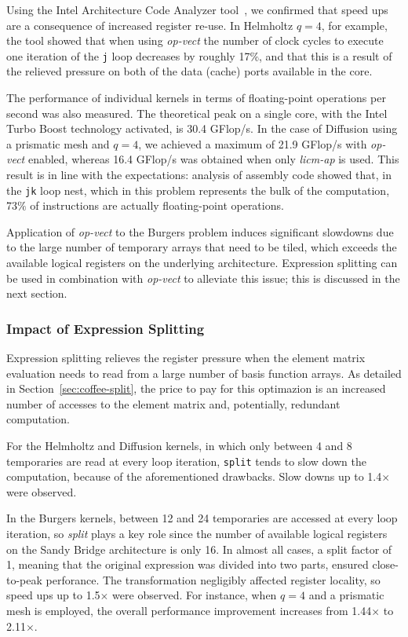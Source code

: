 Using the Intel Architecture Code Analyzer tool~\cite{IACA}, we confirmed that speed ups are a consequence of increased register re-use. In Helmholtz $q=4$, for example, the tool showed that when using \emph{op-vect} the number of clock cycles to execute one iteration of the \texttt{j} loop decreases by roughly 17$\%$, and that this is a result of the relieved pressure on both of the data (cache) ports available in the core.

The performance of individual kernels in terms of floating-point operations per second was also measured. The theoretical peak on a single core, with the Intel Turbo Boost technology activated, is 30.4 GFlop/s. In the case of Diffusion using a prismatic mesh and $q=4$, we achieved a maximum of 21.9 GFlop/s with \emph{op-vect} enabled, whereas 16.4 GFlop/s was obtained when only \emph{licm-ap} is used. This result is in line with the expectations: analysis of assembly code showed that, in the \texttt{jk} loop nest, which in this problem represents the bulk of the computation, 73$\%$ of instructions are actually floating-point operations.

Application of \emph{op-vect} to the Burgers problem induces significant slowdowns due to the large number of temporary arrays that need to be tiled, which exceeds the available logical registers on the underlying architecture. Expression splitting can be used in combination with \emph{op-vect} to alleviate this issue; this is discussed in the next section.


\subsubsection{Impact of Expression Splitting}
\label{sec:perf-results-split} 
Expression splitting relieves the register pressure when the element matrix evaluation needs to read from a large number of basis function arrays. As detailed in Section~\ref{sec:coffee-split}, the price to pay for this optimazion is an increased number of accesses to the element matrix and, potentially, redundant computation. 

For the Helmholtz and Diffusion kernels, in which only between 4 and 8 temporaries are read at every loop iteration, \texttt{split} tends to slow down the computation, because of the aforementioned drawbacks. Slow downs up to 1.4$\times$ were observed. 

In the Burgers kernels, between 12 and 24 temporaries are accessed at every loop iteration, so \emph{split} plays a key role since the number of available logical registers on the Sandy Bridge architecture is only 16. In almost all cases, a split factor of 1, meaning that the original expression was divided into two parts, ensured close-to-peak perforance. The transformation negligibly affected register locality, so speed ups up to 1.5$\times$ were observed. For instance, when $q=4$ and a prismatic mesh is employed, the overall performance improvement increases from 1.44$\times$ to 2.11$\times$. 

